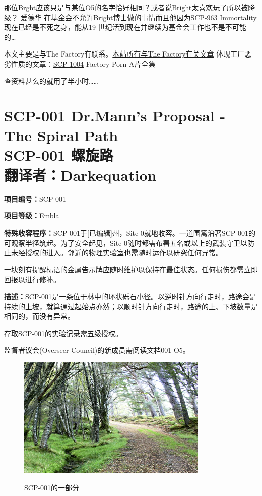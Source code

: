 \documentclass[openany,a4paper]{book} %
\newcounter{mychapter} %
\begin{document}
那位Brght应该只是与某位O5的名字恰好相同？或者说Bright太喜欢玩了所以被降级？ 爱德华 在基金会不允许Bright博士做的事情而且他因为\hyperref[chap:SCP-963]{SCP-963} Immortality现在已经是不死之身，能从19 世纪活到现在并继续为基金会工作也不是不可能的…\vspace{12pt}

本文主要是与The Factory有联系。\href{http://www.google.com/search?hl=zh&as_q=&as_oq=factory&as_sitesearch=scpfoundation.123ubb.com}{本站所有与The Factory有关文章} 体现工厂恶劣性质的文章：\hyperref[SCP-1004]{SCP-1004} Factory Porn A片全集 \vspace{12pt}

查资料甚么的就用了半小时……

\addtocounter{mychapter}{1}
\chapter[SCP-001 螺旋路]{SCP-001 Dr.Mann's Proposal - The Spiral Path \\ SCP-001 螺旋路 \\ 翻译者：Darkequation}\label{chap:SCP-001-6}

\textbf{项目编号：}SCP-001\vspace{12pt}

\textbf{项目等级：}Embla\vspace{12pt}

\textbf{特殊收容程序：}SCP-001于[已编辑]州，Site 0就地收容。一道围篱沿著SCP-001的可观察半径筑起。为了安全起见，Site 0随时都需布署五名或以上的武装守卫以防止未经授权的进入。邻近的物理实验室也需随时运作以研究任何异常。\vspace{12pt}

一块刻有提醒标语的金属告示牌应随时维护以保持在最佳状态。任何损伤都需立即回报以进行修补。\vspace{12pt}

\textbf{描述：}SCP-001是一条位于林中的环状砾石小径。以逆时针方向行走时，路途会是持续的上坡，就算通过起始点亦然；以顺时针方向行走时，路途的上、下坡数量是相同的，而没有异常。\vspace{12pt}

存取SCP-001的实验记录需五级授权。\vspace{12pt}

监督者议会(Overseer Council)的新成员需阅读文档001-O5。\vspace{12pt}

\begin{figure}[H]
  \centering
  \includegraphics{Pic/SCP-001-6.jpg}\\
  \caption{SCP-001的一部分}\label{fig:SCP-001-6}
\end{figure}
\end{document}
